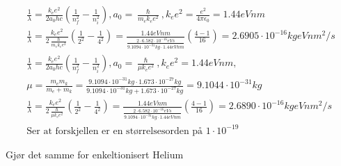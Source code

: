 \documentclass[11pt, A4paper,norsk]{article}
\begin{document}
				\begin{gather*}
\frac{1}{\lambda} = \frac{k_e e^2}{2 a_0 h c} \left( \frac{1}{n_f^2} - \frac{1}{n_i^2} \right), a_0 = \frac{\hslash}{m_e k_e e^2}, k_e e^2 = \frac{e^2}{4 \pi \epsilon_0} = 1.44 eV nm \\
\frac{1}{\lambda} = \frac{k_e e^2}{2 \frac{\hslash}{m_e k_e e^2}} \left( \frac{1}{2^2} - \frac{1}{4^2} \right) = \frac{1.44 eV nm}{\frac{2 \cdot6.582 \cdot 10^{-16} eV s}{9.1094 \cdot 10^{-31} kg \cdot 1.44 eV nm}} \left( \frac{4 - 1}{16} \right) = 2.6905 \cdot 10^{-16} kg eV nm^2/s \\
\frac{1}{\lambda} = \frac{k_e e^2}{2 a_0 h c} \left( \frac{1}{n_f^2} - \frac{1}{n_i^2} \right), a_0 = \frac{\hslash}{\mu k_e e^2}, k_e e^2 = 1.44 eV nm, \\
\mu = \frac{m_e m_k}{m_e + m_k} = \frac{9.1094 \cdot 10^{-31} kg \cdot 1.673 \cdot 10^{-27} kg}{9.1094 \cdot 10^{-31} kg + 1.673 \cdot 10^{-27} kg} =  9.1044 \cdot 10^{-31} kg \\
\frac{1}{\lambda} = \frac{k_e e^2}{2 \frac{\hslash}{\mu k_e e^2}} \left( \frac{1}{2^2} - \frac{1}{4^2} \right) = \frac{1.44 eV nm}{\frac{2 \cdot6.582 \cdot 10^{-16} eV s}{9.1094 \cdot 10^{-31} kg \cdot 1.44 eV nm}} \left( \frac{4 - 1}{16} \right) = 2.6890 \cdot 10^{-16} kg eV nm^2/s \\
\text{Ser at forskjellen er en størrelsesorden på $1 \cdot 10^{-19}$}
				\end{gather*}
				\begin{flushleft}
Gjør det samme for enkeltionisert Helium
				\end{flushleft}
\end{document}
